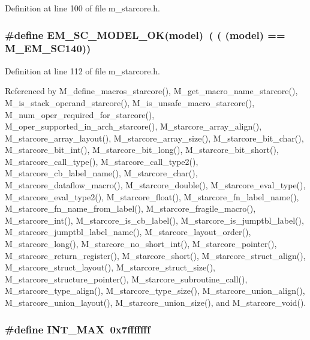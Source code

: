 Definition at line 100 of file m\_\-starcore.h.
\subsubsection{\setlength{\rightskip}{0pt plus 5cm}\#define EM\_\-SC\_\-MODEL\_\-OK(model)~( ( (model) == M\_\-EM\_\-SC140))}\label{m__starcore_8h_500fc70f0452f11c72d1b0b8f755551c}




Definition at line 112 of file m\_\-starcore.h.

Referenced by M\_\-define\_\-macros\_\-starcore(), M\_\-get\_\-macro\_\-name\_\-starcore(), M\_\-is\_\-stack\_\-operand\_\-starcore(), M\_\-is\_\-unsafe\_\-macro\_\-starcore(), M\_\-num\_\-oper\_\-required\_\-for\_\-starcore(), M\_\-oper\_\-supported\_\-in\_\-arch\_\-starcore(), M\_\-starcore\_\-array\_\-align(), M\_\-starcore\_\-array\_\-layout(), M\_\-starcore\_\-array\_\-size(), M\_\-starcore\_\-bit\_\-char(), M\_\-starcore\_\-bit\_\-int(), M\_\-starcore\_\-bit\_\-long(), M\_\-starcore\_\-bit\_\-short(), M\_\-starcore\_\-call\_\-type(), M\_\-starcore\_\-call\_\-type2(), M\_\-starcore\_\-cb\_\-label\_\-name(), M\_\-starcore\_\-char(), M\_\-starcore\_\-dataflow\_\-macro(), M\_\-starcore\_\-double(), M\_\-starcore\_\-eval\_\-type(), M\_\-starcore\_\-eval\_\-type2(), M\_\-starcore\_\-float(), M\_\-starcore\_\-fn\_\-label\_\-name(), M\_\-starcore\_\-fn\_\-name\_\-from\_\-label(), M\_\-starcore\_\-fragile\_\-macro(), M\_\-starcore\_\-int(), M\_\-starcore\_\-is\_\-cb\_\-label(), M\_\-starcore\_\-is\_\-jumptbl\_\-label(), M\_\-starcore\_\-jumptbl\_\-label\_\-name(), M\_\-starcore\_\-layout\_\-order(), M\_\-starcore\_\-long(), M\_\-starcore\_\-no\_\-short\_\-int(), M\_\-starcore\_\-pointer(), M\_\-starcore\_\-return\_\-register(), M\_\-starcore\_\-short(), M\_\-starcore\_\-struct\_\-align(), M\_\-starcore\_\-struct\_\-layout(), M\_\-starcore\_\-struct\_\-size(), M\_\-starcore\_\-structure\_\-pointer(), M\_\-starcore\_\-subroutine\_\-call(), M\_\-starcore\_\-type\_\-align(), M\_\-starcore\_\-type\_\-size(), M\_\-starcore\_\-union\_\-align(), M\_\-starcore\_\-union\_\-layout(), M\_\-starcore\_\-union\_\-size(), and M\_\-starcore\_\-void().
\subsubsection{\setlength{\rightskip}{0pt plus 5cm}\#define INT\_\-MAX~0x7fffffff}\label{m__starcore_8h_9ec306f36d50c7375e74f0d1c55a3a67}




